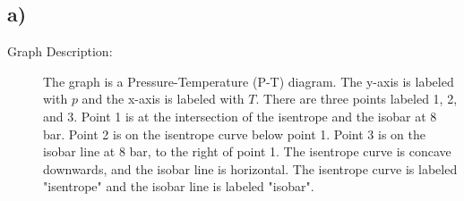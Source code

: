 

\subsection*{a)}

\begin{description}
    \item[Graph Description:] The graph is a Pressure-Temperature (P-T) diagram. The y-axis is labeled with \( p \) and the x-axis is labeled with \( T \). There are three points labeled 1, 2, and 3. Point 1 is at the intersection of the isentrope and the isobar at 8 bar. Point 2 is on the isentrope curve below point 1. Point 3 is on the isobar line at 8 bar, to the right of point 1. The isentrope curve is concave downwards, and the isobar line is horizontal. The isentrope curve is labeled "isentrope" and the isobar line is labeled "isobar".
\end{description}
